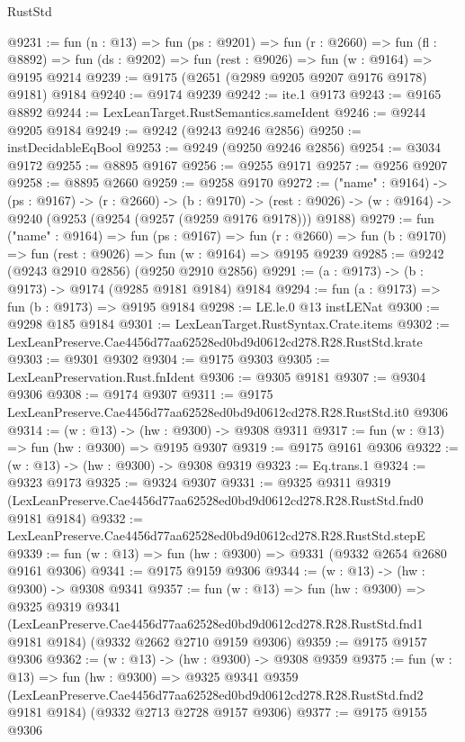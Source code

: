 \begin{lexlean}{RustStd}
\begin{coremodule}
@9231 := fun (n : @13) =>
  fun (ps : @9201) =>
  fun (r : @2660) =>
  fun (fl : @8892) => fun (ds : @9202) => fun (rest : @9026) => fun (w : @9164) => @9195 @9214
@9239 := @9175 (@2651 (@2989 @9205 @9207 @9176 @9178) @9181) @9184
@9240 := @9174 @9239
@9242 := ite.{1} @9173
@9243 := @9165 @8892
@9244 := LexLeanTarget.RustSemantics.sameIdent
@9246 := @9244 @9205 @9184
@9249 := @9242 (@9243 @9246 @2856)
@9250 := instDecidableEqBool
@9253 := @9249 (@9250 @9246 @2856)
@9254 := @3034 @9172
@9255 := @8895 @9167
@9256 := @9255 @9171
@9257 := @9256 @9207
@9258 := @8895 @2660
@9259 := @9258 @9170
@9272 := ("name" : @9164) ->
  (ps : @9167) ->
  (r : @2660) ->
  (b : @9170) ->
  (rest : @9026) -> (w : @9164) -> @9240 (@9253 (@9254 (@9257 (@9259 @9176 @9178))) @9188)
@9279 := fun ("name" : @9164) =>
  fun (ps : @9167) =>
  fun (r : @2660) => fun (b : @9170) => fun (rest : @9026) => fun (w : @9164) => @9195 @9239
@9285 := @9242 (@9243 @2910 @2856) (@9250 @2910 @2856)
@9291 := (a : @9173) -> (b : @9173) -> @9174 (@9285 @9181 @9184) @9184
@9294 := fun (a : @9173) => fun (b : @9173) => @9195 @9184
@9298 := LE.le.{0} @13 instLENat
@9300 := @9298 @185 @9184
@9301 := LexLeanTarget.RustSyntax.Crate.items
@9302 := LexLeanPreserve.Cae4456d77aa62528ed0bd9d0612cd278.R28.RustStd.krate
@9303 := @9301 @9302
@9304 := @9175 @9303
@9305 := LexLeanPreservation.Rust.fnIdent
@9306 := @9305 @9181
@9307 := @9304 @9306
@9308 := @9174 @9307
@9311 := @9175 LexLeanPreserve.Cae4456d77aa62528ed0bd9d0612cd278.R28.RustStd.it0 @9306
@9314 := (w : @13) -> (hw : @9300) -> @9308 @9311
@9317 := fun (w : @13) => fun (hw : @9300) => @9195 @9307
@9319 := @9175 @9161 @9306
@9322 := (w : @13) -> (hw : @9300) -> @9308 @9319
@9323 := Eq.trans.{1}
@9324 := @9323 @9173
@9325 := @9324 @9307
@9331 := @9325
    @9311
    @9319
    (LexLeanPreserve.Cae4456d77aa62528ed0bd9d0612cd278.R28.RustStd.fnd0 @9181 @9184)
@9332 := LexLeanPreserve.Cae4456d77aa62528ed0bd9d0612cd278.R28.RustStd.stepE
@9339 := fun (w : @13) => fun (hw : @9300) => @9331 (@9332 @2654 @2680 @9161 @9306)
@9341 := @9175 @9159 @9306
@9344 := (w : @13) -> (hw : @9300) -> @9308 @9341
@9357 := fun (w : @13) =>
  fun (hw : @9300) =>
  @9325
    @9319
    @9341
    (LexLeanPreserve.Cae4456d77aa62528ed0bd9d0612cd278.R28.RustStd.fnd1 @9181 @9184)
    (@9332 @2662 @2710 @9159 @9306)
@9359 := @9175 @9157 @9306
@9362 := (w : @13) -> (hw : @9300) -> @9308 @9359
@9375 := fun (w : @13) =>
  fun (hw : @9300) =>
  @9325
    @9341
    @9359
    (LexLeanPreserve.Cae4456d77aa62528ed0bd9d0612cd278.R28.RustStd.fnd2 @9181 @9184)
    (@9332 @2713 @2728 @9157 @9306)
@9377 := @9175 @9155 @9306

\end{coremodule}
\end{lexlean}
